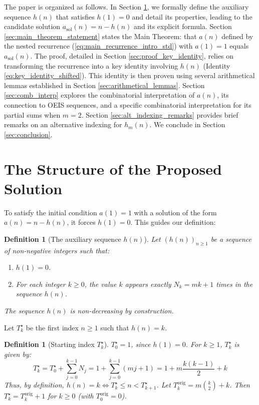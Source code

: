\documentclass[11pt,a4paper]{article} %
\newtheorem{definition}[theorem]{Definition}
\theoremstyle{remark}
\begin{document}
The paper is organized as follows. In Section \ref{sec:solution_structure}, we formally define the auxiliary sequence $h(n)$ that satisfies $h(1)=0$ and detail its properties, leading to the candidate solution $a_{\text{sol}}(n)=n-h(n)$ and its explicit formula. Section \ref{sec:main_theorem_statement} states the Main Theorem: that $a(n)$ defined by the nested recurrence (\ref{eq:main_recurrence_intro_std}) with $a(1)=1$ equals $a_{\text{sol}}(n)$. The proof, detailed in Section \ref{sec:proof_key_identity}, relies on transforming the recurrence into a key identity involving $h(n)$ (Identity \ref{eq:key_identity_shifted}). This identity is then proven using several arithmetical lemmas established in Section \ref{sec:arithmetical_lemmas}. Section \ref{sec:comb_interp} explores the combinatorial interpretation of $a(n)$, its connection to OEIS sequences, and a specific combinatorial interpretation for its partial sums when $m=2$. Section \ref{sec:alt_indexing_remarks} provides brief remarks on an alternative indexing for $h_m(n)$. We conclude in Section \ref{sec:conclusion}.

\section{The Structure of the Proposed Solution} \label{sec:solution_structure}

To satisfy the initial condition $a(1)=1$ with a solution of the form $a(n)=n-h(n)$, it forces $h(1)=0$. This guides our definition:

\begin{definition}[The auxiliary sequence $h(n)$] \label{def:h_shifted}
Let $(h(n))_{n \ge 1}$ be a sequence of non-negative integers such that:
\begin{enumerate}
    \item $h(1)=0$.
    \item For each integer $k \ge 0$, the value $k$ appears exactly $N_k = mk+1$ times in the sequence $h(n)$.
\end{enumerate}
The sequence $h(n)$ is non-decreasing by construction.
\end{definition}

Let $T^{\star}_k$ be the first index $n \ge 1$ such that $h(n)=k$.
\begin{definition}[Starting index $T^{\star}_k$] \label{def:Tk_shifted}
$T^{\star}_0 = 1$, since $h(1)=0$. For $k \ge 1$, $T^{\star}_k$ is given by:
$$T^{\star}_k = T^{\star}_0 + \sum_{j=0}^{k-1} N_j = 1 + \sum_{j=0}^{k-1} (mj+1) = 1 + m\frac{k(k-1)}{2} + k$$
Thus, by definition, $h(n)=k \iff T^{\star}_k \le n < T^{\star}_{k+1}$.
Let $T_k^{\text{orig}} = m\binom{k}{2}+k$. Then $T^{\star}_k = T_k^{\text{orig}}+1$ for $k \ge 0$ (with $T_0^{\text{orig}}=0$).
\end{definition}
\end{document}

